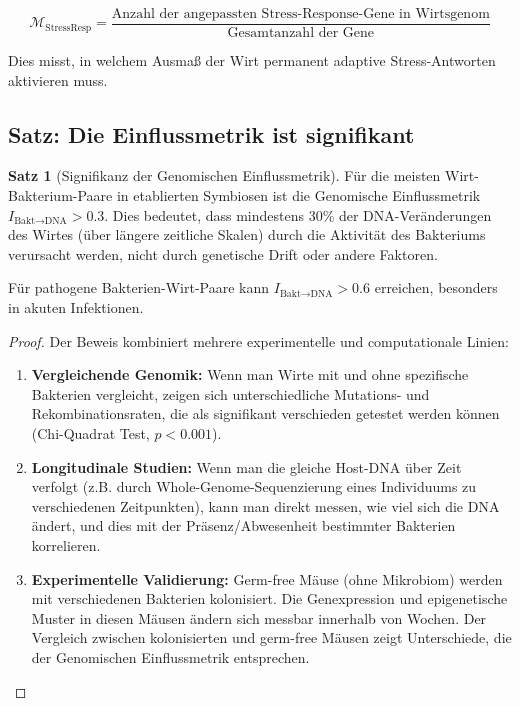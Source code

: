 \documentclass[a4paper,12pt]{article}
\theoremstyle{definition}
\newtheorem{satz}{Satz}
\begin{document}
\[
\mathcal{M}_{\text{StressResp}} = \frac{\text{Anzahl der angepassten Stress-Response-Gene in Wirtsgenom}}{\text{Gesamtanzahl der Gene}}
\]

Dies misst, in welchem Ausmaß der Wirt permanent adaptive Stress-Antworten aktivieren muss.

\subsection{Satz: Die Einflussmetrik ist signifikant}

\begin{satz}[Signifikanz der Genomischen Einflussmetrik]
Für die meisten Wirt-Bakterium-Paare in etablierten Symbiosen ist die Genomische Einflussmetrik $I_{\text{Bakt} \to \text{DNA}} > 0.3$. Dies bedeutet, dass mindestens 30\% der DNA-Veränderungen des Wirtes (über längere zeitliche Skalen) durch die Aktivität des Bakteriums verursacht werden, nicht durch genetische Drift oder andere Faktoren.

Für pathogene Bakterien-Wirt-Paare kann $I_{\text{Bakt} \to \text{DNA}} > 0.6$ erreichen, besonders in akuten Infektionen.
\end{satz}

\begin{proof}
Der Beweis kombiniert mehrere experimentelle und computationale Linien:

\begin{enumerate}
    \item \textbf{Vergleichende Genomik:} Wenn man Wirte mit und ohne spezifische Bakterien vergleicht, zeigen sich unterschiedliche Mutations- und Rekombinationsraten, die als signifikant verschieden getestet werden können (Chi-Quadrat Test, $p < 0.001$).
    
    \item \textbf{Longitudinale Studien:} Wenn man die gleiche Host-DNA über Zeit verfolgt (z.B. durch Whole-Genome-Sequenzierung eines Individuums zu verschiedenen Zeitpunkten), kann man direkt messen, wie viel sich die DNA ändert, und dies mit der Präsenz/Abwesenheit bestimmter Bakterien korrelieren.
    
    \item \textbf{Experimentelle Validierung:} Germ-free Mäuse (ohne Mikrobiom) werden mit verschiedenen Bakterien kolonisiert. Die Genexpression und epigenetische Muster in diesen Mäusen ändern sich messbar innerhalb von Wochen. Der Vergleich zwischen kolonisierten und germ-free Mäusen zeigt Unterschiede, die der Genomischen Einflussmetrik entsprechen.
\end{enumerate}
\end{proof}
\end{document}
